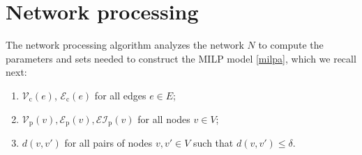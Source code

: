 \documentclass[review]{elsarticle}
\newcommand{\cE}{{\mathcal E}}
\newcommand{\cEI}{{\mathcal {EI}}}
\newcommand{\cV}{{\mathcal V}}
\newcommand{\st}{{\text{ s.t. }}}
\newcommand{\dlt}{{\delta}}
\theoremstyle{definition}
\begin{document}
\begin{comment}
 	y_{e_2^j}\leq y_{e_{n_j-2}^j} &\forall j\in J \st n_j \textup{ is even} \label{valid-break-d1}\\
 	q_{e_{n_j-2}^j}\leq q_{e_{2}^j}+l_{e_{n_j-2}^j}(1-y_{e_2^j}) &\forall j\in J \st n_j \textup{ is even} \label{valid-break-d4}\\
 	q_{e_{n_j-2}^j}\geq q_{e_{2}^j}-l_{e_{n_j-2}^j}(1-y_{e_2^j}) &\forall j\in J \st n_j \textup{ is even} \label{valid-break-d5}\\
 	r_{v_{n_j-1}^j}\leq q_{e_{2}^j}+U_{v_{n_j-1}^j}(1-y_{e_2^j}) &\forall j\in J \st n_j \textup{ is even} \label{valid-break-d2}\\
 	r_{v_{n_j-1}^j}\geq q_{e_{2}^j}-U_{v_{n_j-1}^j}(1-y_{e_2^j}) &\forall j\in J \st n_j \textup{ is even} \label{valid-break-d3}\\
 	\dlt w_{e_{n_j-2}^j}+r_{v_{n_j-1}^j}\geq \dlt-q_{e_{2}^j}-\dlt(1-y_{e_2^j}) &\forall j\in J \st n_j \textup{ is odd} \label{valid-break-d6}
	\end{eqnarray}
\end{enumerate}
The number of valid inequalities \eqref{valid-break-a1}-\eqref{valid-break-d6} added to the model is $11\cdot|J|$, while the number of eliminated constraints and variables is significantly greater.
\end{comment}

\section{Network processing}\label{sec:prepro}
The network processing algorithm analyzes
the network $N$ to compute the parameters and sets needed to construct the MILP model \eqref{milpa}, which we recall next:

\begin{enumerate}
	\item $\cV_{\mathrm{c}}(e)$, $\cE_{\mathrm{c}}(e)$ for all edges $e \in E$;
	\item $\cV_{\mathrm{p}}(v), \cE_{\mathrm{p}}(v), \cEI_{\mathrm{p}}(v)$ for all nodes $v \in V$;
	\item $d(v,v')$ for all pairs of nodes $v,v' \in V$ such that $d(v,v') \le \dlt$.
\end{enumerate}
\end{document}
